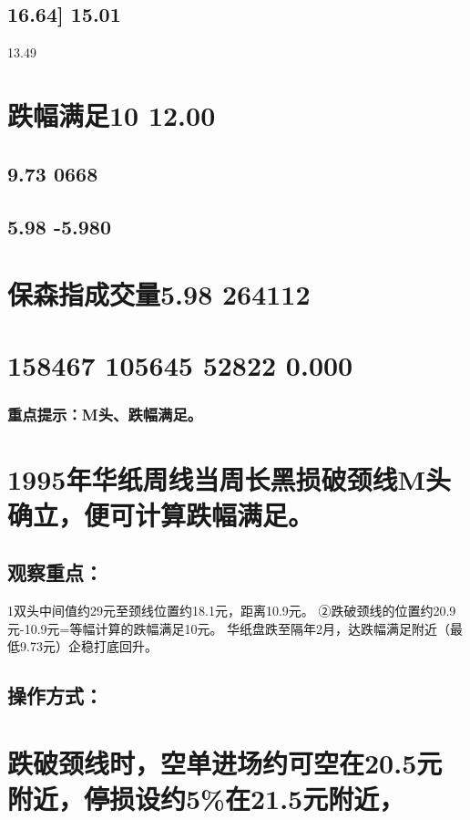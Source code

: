 \documentclass{article}
\begin{document}
\subsection{16.64] 15.01}

13.49

\section{跌幅满足10 12.00}

\subsection{9.73 0668}

\subsection{5.98 -5.980}

\section{保森指成交量5.98 264112}

\section{158467 105645 52822 0.000}

\subsubsection{重点提示：M头、跌幅满足。}

\section{1995年华纸周线当周长黑损破颈线M头确立，便可计算跌幅满足。}

\subsection{观察重点：}

1双头中间值约29元至颈线位置约18.1元，距离10.9元。 ②跌破颈线的位置约20.9元-10.9元=等幅计算的跌幅满足10元。 华纸盘跌至隔年2月，达跌幅满足附近（最低9.73元）企稳打底回升。

\subsection{操作方式：}

\section{跌破颈线时，空单进场约可空在20.5元附近，停损设约5\%在21.5元附近，}
\end{document}
